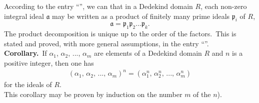 \documentclass[12pt]{article}
\theoremstyle{definition}
\begin{document}
According to the entry ``'', we can  that in a Dedekind domain $R$, each non-zero integral ideal $\mathfrak{a}$ may be written as a product of finitely many prime ideals $\mathfrak{p}_i$ of $R$, 
 $$\mathfrak{a} = \mathfrak{p}_1\mathfrak{p}_2...\mathfrak{p}_k.$$
The product decomposition is unique up to the order of the factors.\, This is stated and proved, with more general assumptions, in the entry ``''.\\

\textbf{Corollary.}\, If $\alpha_1$, $\alpha_2$, ..., $\alpha_m$ are elements of a Dedekind domain $R$ and $n$ is a positive integer, then one has
\begin{align}
  (\alpha_1,\,\alpha_2,\,...,\,\alpha_m)^n = 
  (\alpha_1^n,\,\alpha_2^n,\,...,\,\alpha_m^n)
\end{align}
for the ideals of $R$.\\

This corollary may be proven by induction on the number $m$ of the  $n$).
\end{document}
